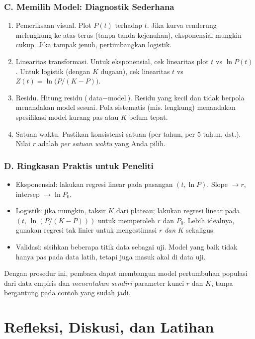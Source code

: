 \documentclass{bukumjh}
\begin{document}
\subsubsection{C. Memilih Model: Diagnostik Sederhana}

\begin{enumerate}
    \item {\jsg Pemeriksaan visual.} Plot $P(t)$ terhadap $t$. Jika kurva cenderung melengkung ke atas terus (tanpa tanda kejenuhan), eksponensial mungkin cukup. Jika tampak jenuh, pertimbangkan logistik.
    \item {\jsg Linearitas transformasi.} Untuk eksponensial, cek linearitas plot $t$ vs $\ln P(t)$. Untuk logistik (dengan $K$ dugaan), cek linearitas $t$ vs $Z(t)=\ln\!\bigl(P/(K-P)\bigr)$.
    \item {\jsg Residu.} Hitung residu ($\text{data} - \text{model}$). Residu yang kecil dan tidak berpola menandakan model sesuai. Pola sistematis (mis. lengkung) menandakan spesifikasi model kurang pas atau $K$ belum tepat.
    \item {\jsg Satuan waktu.} Pastikan konsistensi satuan (per tahun, per 5 tahun, dst.). Nilai $r$ adalah \emph{per satuan waktu} yang Anda pilih.
\end{enumerate}

\subsubsection*{D. Ringkasan Praktis untuk Peneliti}
\begin{itemize}
    \item {\jsg Eksponensial:} lakukan regresi linear pada pasangan $(t,\ln P)$. Slope $\to r$, intersep $\to \ln P_0$.
    \item {\jsg Logistik:} jika mungkin, taksir $K$ dari plateau; lakukan regresi linear pada $(t,\,\ln(P/(K-P)))$ untuk memperoleh $r$ dan $P_0$. Lebih idealnya, gunakan regresi tak linier untuk mengestimasi $r$ \emph{dan} $K$ sekaligus.
    \item {\jsg Validasi:} sisihkan beberapa titik data sebagai uji. Model yang baik tidak hanya pas pada data latih, tetapi juga masuk akal di data uji.
\end{itemize}

\noindent
Dengan prosedur ini, pembaca dapat membangun model pertumbuhan populasi dari data empiris dan \emph{menentukan sendiri} parameter kunci $r$ dan $K$, tanpa bergantung pada contoh yang sudah jadi.

\section{Refleksi, Diskusi, dan Latihan}
\end{document}
